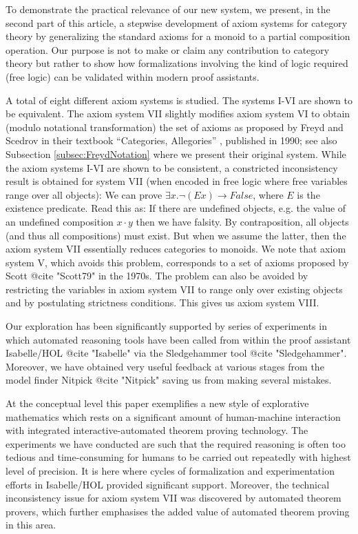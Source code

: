 To demonstrate the practical relevance of our new system, we present,
in the second part of this article, a stepwise development of axiom
systems for category theory by generalizing the standard axioms for a
monoid to a partial composition operation. Our purpose is not to make
or claim any contribution to category theory but rather to show how
formalizations involving the kind of logic required (free logic) can
be validated within modern proof assistants.

A total of eight different axiom systems is studied. The systems I-VI
are shown to be equivalent. The axiom system VII slightly modifies
axiom system VI to obtain (modulo notational transformation) the set
of axioms as proposed by Freyd and Scedrov in their textbook
``Categories, Allegories'' \cite{FreydScedrov90}, published in 1990;
see also Subsection \ref{subsec:FreydNotation} where we present their
original system.  While the axiom systems I-VI are shown to be
consistent, a constricted inconsistency result is obtained for system
VII (when encoded in free logic where free variables range over all
objects): We can prove $\exists x. \neg(E x) \rightarrow False$, where
$E$ is the existence predicate. Read this as: If there are undefined
objects, e.g. the value of an undefined composition $x\cdot y$
then we have falsity.  By contraposition, all objects (and thus all
compositions) must exist. But when we assume the latter, then the
axiom system VII essentially reduces categories to monoids.  We note
that axiom system V, which avoids this problem, corresponds to a set
of axioms proposed by Scott @{cite "Scott79"} in the 1970s. The
problem can also be avoided by restricting the variables in axiom
system VII to range only over existing objects and by postulating
strictness conditions.  This gives us axiom system VIII.

Our exploration has been significantly supported by series of experiments in which automated reasoning tools 
have been called from within the proof assistant Isabelle/HOL @{cite "Isabelle"} via the Sledgehammer 
tool @{cite "Sledgehammer"}. Moreover, we have obtained very useful feedback at various stages 
from the model finder Nitpick @{cite "Nitpick"} saving us from making several mistakes.

At the conceptual level this paper exemplifies a new style of explorative mathematics which rests 
on a significant amount of human-machine interaction with integrated interactive-auto\-ma\-ted 
theorem proving technology. The experiments we have conducted are such that the required 
reasoning is often too tedious and time-consuming for humans to be carried out repeatedly with 
highest level of precision. It is here where cycles of formalization and experimentation efforts in 
Isabelle/HOL provided  significant support. Moreover, the technical inconsistency issue for
axiom system VII was discovered by automated theorem provers, which further emphasises the added 
value of automated theorem proving in this area. 

